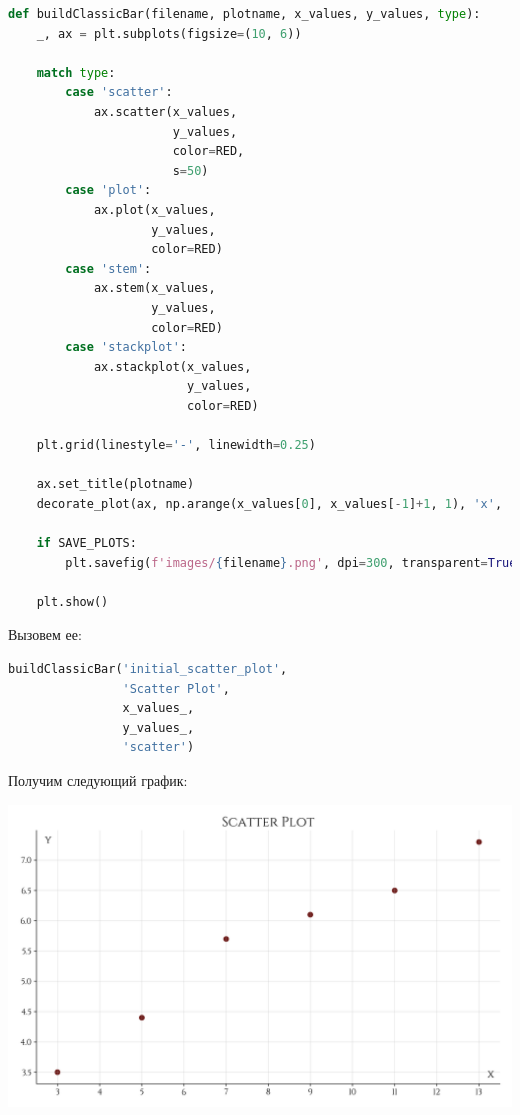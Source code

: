\documentclass[a4paper, 14pt]{extarticle}
\begin{document}
\begin{center}
    \begin{lstlisting}[language=Python]
def buildClassicBar(filename, plotname, x_values, y_values, type):
    _, ax = plt.subplots(figsize=(10, 6))

    match type:
        case 'scatter':
            ax.scatter(x_values, 
                       y_values, 
                       color=RED,
                       s=50)
        case 'plot':
            ax.plot(x_values, 
                    y_values, 
                    color=RED)
        case 'stem':
            ax.stem(x_values, 
                    y_values, 
                    color=RED)
        case 'stackplot':
            ax.stackplot(x_values, 
                         y_values, 
                         color=RED)

    plt.grid(linestyle='-', linewidth=0.25)

    ax.set_title(plotname)
    decorate_plot(ax, np.arange(x_values[0], x_values[-1]+1, 1), 'x', 'y', '')
    
    if SAVE_PLOTS:
        plt.savefig(f'images/{filename}.png', dpi=300, transparent=True)

    plt.show()
    \end{lstlisting}
\end{center}

Вызовем ее:

\begin{center}
    \begin{lstlisting}[language=Python]
buildClassicBar('initial_scatter_plot', 
                'Scatter Plot', 
                x_values_, 
                y_values_, 
                'scatter')
    \end{lstlisting}
\end{center}

Получим следующий график:

\begin{center}
    \includegraphics[width=1\textwidth, height=0.5\textheight, keepaspectratio]{initial_scatter_plot} \\
\end{center}
\end{document}
